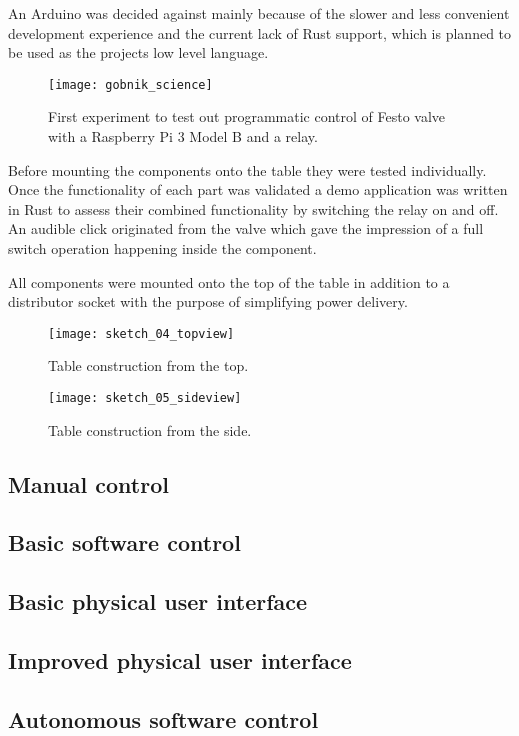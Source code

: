 An Arduino was decided against mainly because of the slower and less convenient development experience and the current lack of Rust \cite{rust} support, which is planned to be used as the projects low level language.

\begin{figure}[h]
\centering

\texttt{[image: gobnik\_science]}

\caption{First experiment to test out programmatic control of Festo valve with a Raspberry Pi 3 Model B and a relay.}
\end{figure}

Before mounting the components onto the table they were tested individually. Once the functionality of each part was validated a demo application was written in Rust to assess their combined functionality by switching the relay on and off. An audible click originated from the valve which gave the impression of a full switch operation happening inside the component.

All components were mounted onto the top of the table in addition to a distributor socket with the purpose of simplifying power delivery.


\begin{figure}[h]
\centering

\texttt{[image: sketch\_04\_topview]}

\caption{Table construction from the top.}
\end{figure}

\begin{figure}[h]
\centering

\texttt{[image: sketch\_05\_sideview]}

\caption{Table construction from the side.}
\end{figure}

\subsection{Manual control}

\subsection{Basic software control}


\subsection{Basic physical user interface}


\subsection{Improved physical user interface}


\subsection{Autonomous software control}